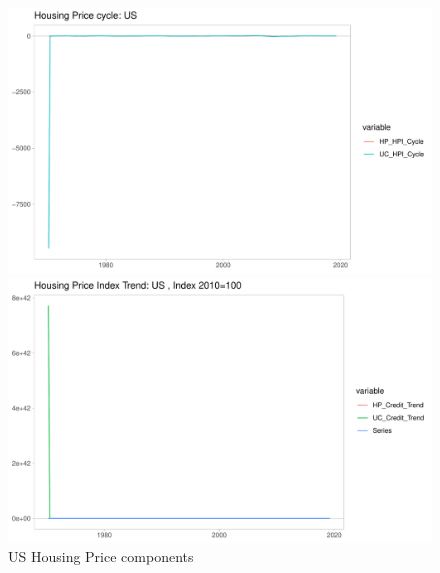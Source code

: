 \documentclass[fleqn]{article}
\begin{document}
\begin{outline}[enumerate]
\begin{figure}[h!]
	\caption{US Housing Price components}	
	\centerline{\includegraphics[scale=0.7]{../../VAR_2_notempcovar/Output/Graphs/HP_cycle_US.pdf}}
	\centerline{\includegraphics[scale=0.7]{../../VAR_2_notempcovar/Output/Graphs/HP_trend_US.pdf}}
\end{figure}


\end{outline}
\end{document}
